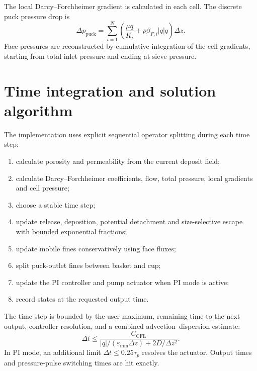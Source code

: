 \documentclass[11pt,a4paper]{article}
\begin{document}
The local Darcy--Forchheimer gradient is calculated in each cell. The discrete
puck pressure drop is
\begin{equation}
\Delta p_{\mathrm{puck}}=
\sum_{i=1}^{N}
\left(\frac{\mu q}{K_i}+\rho\beta_{F,i}|q|q\right)\Delta z.
\end{equation}
Face pressures are reconstructed by cumulative integration of the cell
gradients, starting from total inlet pressure and ending at sieve pressure.

\section{Time integration and solution algorithm}

The implementation uses explicit sequential operator splitting during each
time step:
\begin{enumerate}
  \item calculate porosity and permeability from the current deposit field;
  \item calculate Darcy--Forchheimer coefficients, flow, total pressure, local
  gradients and cell pressure;
  \item choose a stable time step;
  \item update release, deposition, potential detachment and size-selective
  escape with bounded exponential fractions;
  \item update mobile fines conservatively using face fluxes;
  \item split puck-outlet fines between basket and cup;
  \item update the PI controller and pump actuator when PI mode is active;
  \item record states at the requested output time.
\end{enumerate}

The time step is bounded by the user maximum, remaining time to the next output,
controller resolution, and a combined advection--dispersion estimate:
\begin{equation}
\Delta t\leq \frac{C_{\mathrm{CFL}}}
{|q|/(\varepsilon_{\min}\Delta z)+2D/\Delta z^2}.
\end{equation}
In PI mode, an additional limit $\Delta t\leq0.25\tau_p$ resolves the actuator.
Output times and pressure-pulse switching times are hit exactly.
\end{document}
